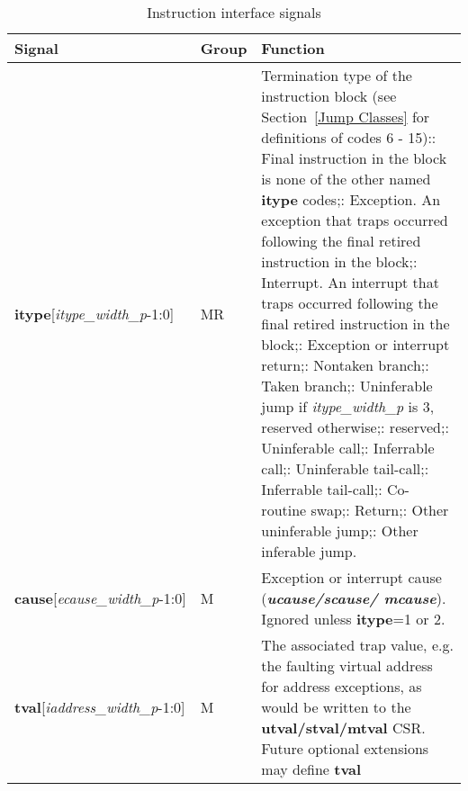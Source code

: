 \begin{table}[htp]
    \centering
    \caption{Instruction interface signals}
    \label{tab:common-ingress}
    \begin{tabulary}{\textwidth}{|l|l|p{80mm}|}
        \hline
        \textbf{Signal} & \textbf{Group} & \textbf{Function} \\
        \hline
        \textbf{itype}[\textit{itype\_width\_p}-1:0] & MR & Termination type of the instruction block (see Section~\ref{Jump Classes} for definitions of codes 6 - 15):: Final instruction in the block is none of the other named \textbf{itype} codes;: Exception. An exception that traps occurred following the final retired instruction in the block;: Interrupt. An interrupt that traps occurred following the final retired instruction in the block;: Exception or interrupt return;: Nontaken branch;: Taken branch;: Uninferable jump if \textit{itype\_width\_p} is 3, reserved otherwise;: reserved;: Uninferable call;: Inferrable call;: Uninferable tail-call;: Inferrable tail-call;: Co-routine swap;: Return;: Other uninferable jump;: Other inferable jump.\\
        \hline
        \textbf{cause}[\textit{ecause\_width\_p}-1:0] & M & Exception or interrupt cause (\textbf{\textit{ucause/scause/ mcause}}).
        Ignored unless \textbf {itype}=1 or 2.\\
        \hline
        \textbf{tval}[\textit{iaddress\_width\_p}-1:0] & M & The associated trap value, e.g. the
        faulting virtual address for address exceptions, as would be
        written to the \textbf{utval/stval/mtval} CSR. Future optional extensions may define \textbf{tval} 

\end{tabulary}
\end{table}
